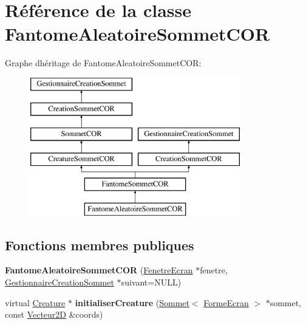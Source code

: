 \hypertarget{class_fantome_aleatoire_sommet_c_o_r}{}\section{Référence de la classe Fantome\+Aleatoire\+Sommet\+C\+OR}
\label{class_fantome_aleatoire_sommet_c_o_r}
Graphe d\textquotesingle{}héritage de Fantome\+Aleatoire\+Sommet\+C\+OR\+:\begin{figure}[H]
\begin{center}
\leavevmode
\includegraphics[height=6.000000cm]{class_fantome_aleatoire_sommet_c_o_r}
\end{center}
\end{figure}
\subsection*{Fonctions membres publiques}
\begin{DoxyCompactItemize}
\item 
\mbox{\label{class_fantome_aleatoire_sommet_c_o_r_a4bcfc2b33aeb5354861009b85ba887bd}} 
{\bfseries Fantome\+Aleatoire\+Sommet\+C\+OR} (\mbox{\hyperlink{class_fenetre_ecran}{Fenetre\+Ecran}} $\ast$fenetre, \mbox{\hyperlink{class_gestionnaire_creation_sommet}{Gestionnaire\+Creation\+Sommet}} $\ast$suivant=N\+U\+LL)
\item 
\mbox{\label{class_fantome_aleatoire_sommet_c_o_r_a34240cce551ff6d8ba3c5e14426407fc}} 
virtual \mbox{\hyperlink{class_creature}{Creature}} $\ast$ {\bfseries initialiser\+Creature} (\mbox{\hyperlink{class_sommet}{Sommet}}$<$ \mbox{\hyperlink{class_forme_ecran}{Forme\+Ecran}} $>$ $\ast$sommet, const \mbox{\hyperlink{class_vecteur2_d}{Vecteur2D}} \&coords)
\end{DoxyCompactItemize}
